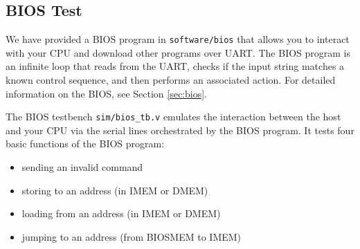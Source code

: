\subsection{BIOS Test}
We have provided a BIOS program in \verb|software/bios| that allows you to interact
with your CPU and download other programs over UART.
The BIOS program is an infinite loop that reads from the UART,
checks if the input string matches a known control sequence,
and then performs an associated action.
For detailed information on the BIOS, see Section \ref{sec:bios}.

The BIOS testbench \verb|sim/bios_tb.v| emulates the interaction between
the host and your CPU via the serial lines orchestrated by the BIOS program.
It tests four basic functions of the BIOS program:
\begin{itemize}
\item sending an invalid command
\item storing to an address (in IMEM or DMEM)
\item loading from an address (in IMEM or DMEM)
\item jumping to an address (from BIOSMEM to IMEM)
\end{itemize}


\newpage

